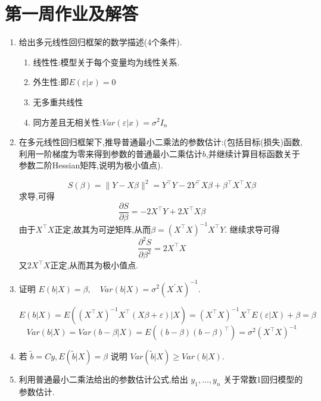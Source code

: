 \section{第一周作业及解答}
\begin{enumerate}


\item 给出多元线性回归框架的数学描述(4个条件).

\begin{proofc}[提示]
    \begin{enumerate}
    \item 线性性:模型关于每个变量均为线性关系.
    \item 外生性:即$E(\varepsilon | x)=0$
    \item 无多重共线性
    \item 同方差且无相关性:$Var(\varepsilon | x)=\sigma^2I_n$
\end{enumerate}
\end{proofc}

\item 在多元线性回归框架下,推导普通最小二乘法的参数估计:(包括目标(损失)函数,利用一阶梯度为零来得到参数的普通最小二乘估计$b$,并继续计算目标函数关于参数二阶Hessian矩阵,说明为极小值点).
\begin{proofc}[提示]
    $$S(\beta)=\|Y-X\beta\|^2=Y^\top Y-2Y^\top X\beta+\beta^\top X^\top X\beta$$
    求导,可得
    $$\frac{\partial S}{\partial \beta}=-2X^\top Y+2X^\top X\beta$$
    由于$X^\top X$正定,故其为可逆矩阵,从而$\beta=(X^\top X)^{-1}X^\top Y$.
    继续求导可得
    $$\frac{\partial ^2S}{\partial \beta^2}=2X^\top X$$
    又$2X^\top X$正定,从而其为极小值点.
\end{proofc}
\item 证明 $E(b|X)=\beta, \quad Var(b|X)=\sigma^{2}(X^{\prime}X)^{-1}.$ 
\begin{proofc}[提示]
$$E(b|X)=E((X^\top X)^{-1}X^\top(X\beta+\varepsilon)|X)=(X^\top X)^{-1}X^\top E(\varepsilon|X)+\beta=\beta$$
$$Var(b|X)=Var(b-\beta|X)=E((b-\beta)(b-\beta)^\top)=\sigma^2(X^\top X)^{-1}$$
\end{proofc}
\item 若 $\tilde{b}=Cy, E(\tilde{b}|X)=\beta$ 说明 $Var(\tilde{b}|X)\ge Var(b|X)$.

\item 利用普通最小二乘法给出的参数估计公式,给出 $y_{1},\dots,y_{n}$ 关于常数1回归模型的参数估计.


\end{enumerate}

